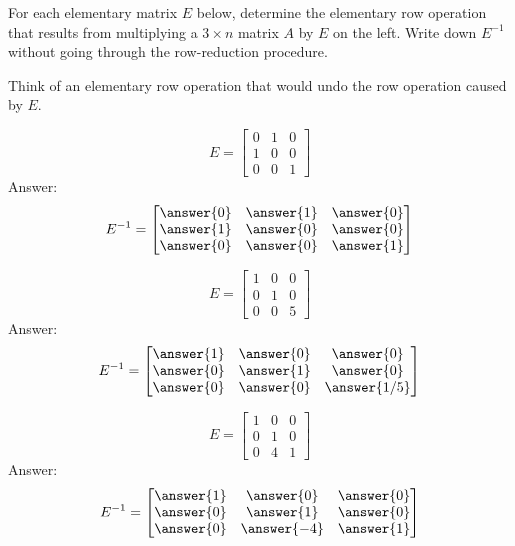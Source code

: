 \documentclass{ximera}
\begin{document}
\begin{problem}
For each elementary matrix $E$ below, determine the elementary row operation that results from multiplying a $3\times n$ matrix $A$ by $E$ on the left.  Write down $E^{-1}$ without going through the row-reduction procedure.
\begin{hint}
Think of an elementary row operation that would undo the row operation caused by $E$.
\end{hint}

\begin{problem}
$$E=\begin{bmatrix}0&1&0\\1&0&0\\0&0&1\end{bmatrix}$$
Answer:
$$E^{-1}=\begin{bmatrix}\answer{0}&\answer{1}&\answer{0}\\\answer{1}&\answer{0}&\answer{0}\\\answer{0}&\answer{0}&\answer{1}\end{bmatrix}$$
\end{problem}

\begin{problem}
$$E=\begin{bmatrix}1&0&0\\0&1&0\\0&0&5\end{bmatrix}$$
Answer:
$$E^{-1}=\begin{bmatrix}\answer{1}&\answer{0}&\answer{0}\\\answer{0}&\answer{1}&\answer{0}\\\answer{0}&\answer{0}&\answer{1/5}\end{bmatrix}$$
\end{problem}

\begin{problem}
$$E=\begin{bmatrix}1&0&0\\0&1&0\\0&4&1\end{bmatrix}$$
Answer:
$$E^{-1}=\begin{bmatrix}\answer{1}&\answer{0}&\answer{0}\\\answer{0}&\answer{1}&\answer{0}\\\answer{0}&\answer{-4}&\answer{1}\end{bmatrix}$$
\end{problem}

\end{problem}
\end{document}
